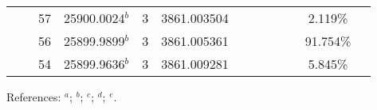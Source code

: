 \begin{table*}
\begin{center}
{\begin{tabular}{:l;l;c;l;c;l;c;l;l;c;c;c;c}
\rowstyle{\itshape}               &        & 57        & 25900.0024$^{b}$                 & 3 &   3861.003504      &      & $                                        $ & $                                        $ &             &              & 2.119\%   & $     ^{}     $\\
\rowstyle{\itshape}               &        & 56        & 25899.9899$^{b}$                 & 3 &   3861.005361      &      & $                                        $ & $                                        $ &             &              & 91.754\%  & $     ^{}     $\\
\rowstyle{\itshape}               &        & 54        & 25899.9636$^{b}$                 & 3 &   3861.009281      &      & $                                        $ & $                                        $ &             &              & 5.845\%   & $     ^{}     $\\
\hline
\end{tabular}
}
{\footnotesize References:
$^{a}$\citet{Nave:1994:221;Nave:2011:737};
$^{b}$\citet{Porsev:2009:032519};
$^{c}$\citet{Nave:1994:221;Nave:2011:737. No known Gamma value.};
$^{d}$\citet{Krins:2009:062508};
$^{e}$\citet{Childs:1966:74}.}
\end{center}
\end{table*}
